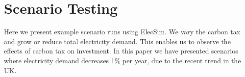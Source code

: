 




\section{Scenario Testing}


Here we present example scenario runs using ElecSim. We vary the carbon tax and grow or reduce total electricity demand. This enables us to observe the effects of carbon tax on investment. In this paper we have presented scenarios where electricity demand decreases 1\% per year, due to the recent trend in the UK.






